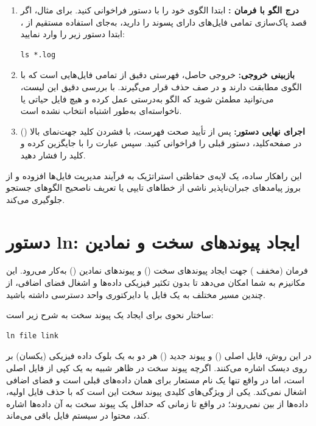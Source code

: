 \begin{enumerate}
  \item \textbf{درج الگو با فرمان :} ابتدا الگوی خود را با دستور  فراخوانی کنید. برای مثال، اگر قصد پاک‌سازی تمامی فایل‌های دارای پسوند  را دارید، به‌جای استفاده مستقیم از ، ابتدا دستور زیر را وارد نمایید:
\begin{latin}
\begin{lstlisting}
ls *.log
\end{lstlisting}
\end{latin}

  \item \textbf{بازبینی خروجی:} خروجی حاصل، فهرستی دقیق از تمامی فایل‌هایی است که با الگوی  مطابقت دارند و در صف حذف قرار می‌گیرند. با بررسی دقیق این لیست، می‌توانید مطمئن شوید که الگو به‌درستی عمل کرده و هیچ فایل حیاتی یا ناخواسته‌ای به‌طور اشتباه انتخاب نشده است.

  \item \textbf{اجرای نهایی دستور:} پس از تأیید صحت فهرست، با فشردن کلید جهت‌نمای بالا () در صفحه‌کلید، دستور قبلی را فراخوانی کنید. سپس عبارت  را با  جایگزین کرده و کلید  را فشار دهید.
\end{enumerate}

این راهکار ساده، یک لایه‌ی حفاظتی استراتژیک به فرآیند مدیریت فایل‌ها افزوده و از بروز پیامدهای جبران‌ناپذیر ناشی از خطاهای تایپی یا تعریف ناصحیح الگوهای جستجو جلوگیری می‌کند.

\section{دستور ln: ایجاد پیوندهای سخت و نمادین}

فرمان  (مخفف ) جهت ایجاد پیوندهای سخت () و پیوندهای نمادین () به‌کار می‌رود. این مکانیزم به شما امکان می‌دهد تا بدون تکثیر فیزیکی داده‌ها و اشغال فضای اضافی، از چندین مسیر مختلف به یک فایل یا دایرکتوری واحد دسترسی داشته باشید.

ساختار نحوی برای ایجاد یک پیوند سخت به شرح زیر است:

\begin{latin}
\begin{lstlisting}
ln file link
\end{lstlisting}
\end{latin}

در این روش، فایل اصلی () و پیوند جدید () هر دو به یک بلوک داده فیزیکی (یکسان) بر روی دیسک اشاره می‌کنند. اگرچه پیوند سخت در ظاهر شبیه به یک کپی از فایل اصلی است، اما در واقع تنها یک نام مستعار برای همان داده‌های قبلی است و فضای اضافی اشغال نمی‌کند. یکی از ویژگی‌های کلیدی پیوند سخت این است که با حذف فایل اولیه، داده‌ها از بین نمی‌روند؛ در واقع تا زمانی که حداقل یک پیوند سخت به آن داده‌ها اشاره کند، محتوا در سیستم‌ فایل باقی می‌ماند.

